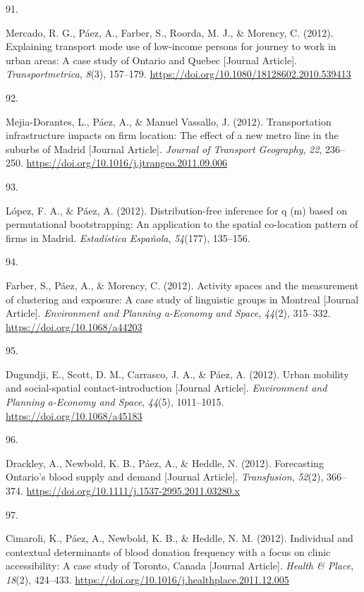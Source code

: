 \documentclass[11pt,a4paper,]{awesome-cv}
\newlength{\cslhangindent}
\newlength{\csllabelwidth}
\newenvironment{CSLReferences}[2] %
 {\begin{list}{}{%
  \setlength{\itemindent}{0pt}
  \setlength{\leftmargin}{0pt}
  \setlength{\parsep}{0pt}
  \ifodd #1
   \setlength{\leftmargin}{\cslhangindent}
   \setlength{\itemindent}{-1\cslhangindent}
  \fi
  \setlength{\itemsep}{#2\baselineskip}}}
 {\end{list}}
\newcommand{\CSLLeftMargin}[1]{\parbox[t]{\csllabelwidth}{\strut#1\strut}}
\newcommand{\CSLRightInline}[1]{\parbox[t]{\linewidth - \csllabelwidth}{\strut#1\strut}}
\begin{document}
\begin{CSLReferences}{0}{0}
\CSLLeftMargin{91. }%
\CSLRightInline{Mercado, R. G., Páez, A., Farber, S., Roorda, M. J., \&
Morency, C. (2012). Explaining transport mode use of low-income persons
for journey to work in urban areas: A case study of Ontario and Quebec
{[}Journal Article{]}. \emph{Transportmetrica}, \emph{8}(3), 157--179.
\url{https://doi.org/10.1080/18128602.2010.539413}}

\CSLLeftMargin{92. }%
\CSLRightInline{Mejia-Dorantes, L., Páez, A., \& Manuel Vassallo, J.
(2012). Transportation infrastructure impacts on firm location: The
effect of a new metro line in the suburbs of Madrid {[}Journal
Article{]}. \emph{Journal of Transport Geography}, \emph{22}, 236--250.
\url{https://doi.org/10.1016/j.jtrangeo.2011.09.006}}

\CSLLeftMargin{93. }%
\CSLRightInline{López, F. A., \& Páez, A. (2012). Distribution-free
inference for q (m) based on permutational bootstrapping: An application
to the spatial co-location pattern of firms in Madrid. \emph{Estadística
Española}, \emph{54}(177), 135--156.}

\CSLLeftMargin{94. }%
\CSLRightInline{Farber, S., Páez, A., \& Morency, C. (2012). Activity
spaces and the measurement of clustering and exposure: A case study of
linguistic groups in Montreal {[}Journal Article{]}. \emph{Environment
and Planning a-Economy and Space}, \emph{44}(2), 315--332.
\url{https://doi.org/10.1068/a44203}}

\CSLLeftMargin{95. }%
\CSLRightInline{Dugundji, E., Scott, D. M., Carrasco, J. A., \& Páez, A.
(2012). Urban mobility and social-spatial contact-introduction
{[}Journal Article{]}. \emph{Environment and Planning a-Economy and
Space}, \emph{44}(5), 1011--1015. \url{https://doi.org/10.1068/a45183}}

\CSLLeftMargin{96. }%
\CSLRightInline{Drackley, A., Newbold, K. B., Páez, A., \& Heddle, N.
(2012). Forecasting Ontario's blood supply and demand {[}Journal
Article{]}. \emph{Transfusion}, \emph{52}(2), 366--374.
\url{https://doi.org/10.1111/j.1537-2995.2011.03280.x}}

\CSLLeftMargin{97. }%
\CSLRightInline{Cimaroli, K., Páez, A., Newbold, K. B., \& Heddle, N. M.
(2012). Individual and contextual determinants of blood donation
frequency with a focus on clinic accessibility: A case study of Toronto,
Canada {[}Journal Article{]}. \emph{Health \& Place}, \emph{18}(2),
424--433. \url{https://doi.org/10.1016/j.healthplace.2011.12.005}}


\end{CSLReferences}
\end{document}
